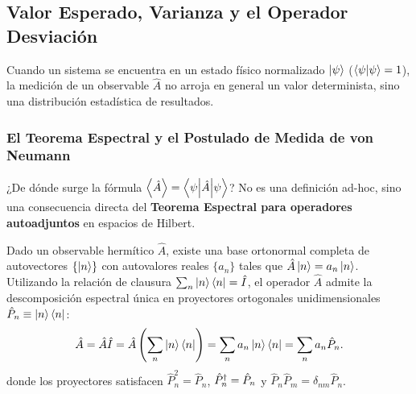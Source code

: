 \subsection{Valor Esperado, Varianza y el Operador Desviación}

Cuando un sistema se encuentra en un estado físico normalizado $\left| \psi \right\rangle$ ($\left\langle \psi \middle| \psi \right\rangle=1$), la medición de un observable $\hat{A}$ no arroja en general un valor determinista, sino una distribución estadística de resultados.

\subsubsection{El Teorema Espectral y el Postulado de Medida de von Neumann}
¿De dónde surge la fórmula $\left\langle \hat{A} \right\rangle = \left\langle \psi \middle| \hat{A} \middle| \psi \right\rangle$? No es una definición ad-hoc, sino una consecuencia directa del \textbf{Teorema Espectral para operadores autoadjuntos} en espacios de Hilbert.

Dado un observable hermítico $\hat{A}$, existe una base ortonormal completa de autovectores $\{\left| n \right\rangle\}$ con autovalores reales $\{a_n\}$ tales que $\hat{A}\left| n \right\rangle = a_n \left| n \right\rangle$. Utilizando la relación de clausura $\sum_n \left| n \right\rangle\left\langle n \right| = \hat{I}$, el operador $\hat{A}$ admite la descomposición espectral única en proyectores ortogonales unidimensionales $\hat{P}_n \equiv \left| n \right\rangle\left\langle n \right|$:
\begin{equation}
    \hat{A} = \hat{A}\hat{I} = \hat{A}\left( \sum_n \left| n \right\rangle\left\langle n \right| \right) = \sum_n a_n \left| n \right\rangle\left\langle n \right| = \sum_n a_n \hat{P}_n.
    \label{eq:spectral_decomposition}
\end{equation}
donde los proyectores satisfacen $\hat{P}_n^2 = \hat{P}_n$, $\hat{P}_n^\dagger = \hat{P}_n$ y $\hat{P}_n\hat{P}_m = \delta_{nm}\hat{P}_n$.

